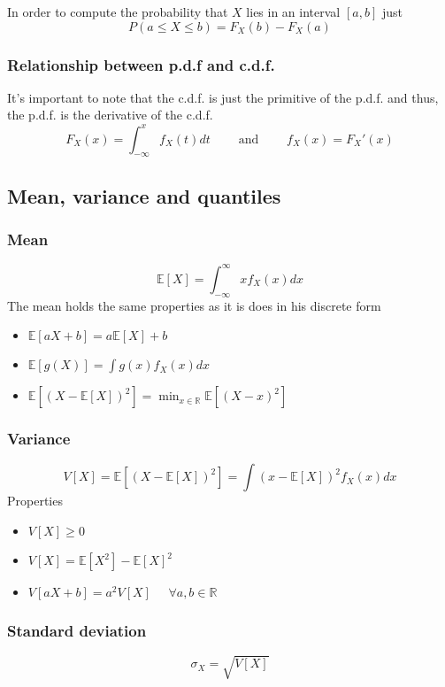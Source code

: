 \begin{tcolorbox}
    In order to compute the probability that $X$ lies in an interval $[a,b]$ just
    \[ P(a\leq X\leq b) = F_X(b)-F_X(a) \]
\end{tcolorbox}

\subsubsection{Relationship between p.d.f and c.d.f.}
It's important to note that the c.d.f. is just the primitive of the p.d.f. and thus, the
p.d.f. is the derivative of the c.d.f.
\[ F_X(x)=\int_{-\infty}^x f_X(t)dt\;\;\;\;\;\;\;\text{ and }\;\;\;\;\;\;\;
f_X(x) = F_X'(x)  \]

\subsection{Mean, variance and quantiles}
\subsubsection{Mean}
\[ \mathbb{E}[X]  = \int_{-\infty}^\infty xf_X(x)dx\]
The mean holds the same properties as it is does in his discrete form
\begin{itemize}
    \item $\mathbb{E}[aX+b] = a\mathbb{E}[X]+b$
    \item $\mathbb{E}[g(X)] = \int g(x)f_X(x)dx$
    \item $\mathbb{E}[(X-\mathbb{E}[X])^2] = \min_{x\in\mathbb{R}} \mathbb{E}[(X-x)^2]$
\end{itemize}

\subsubsection{Variance}
\[ V[X]=\mathbb{E}[(X-\mathbb{E}[X])^2] = \int (x-\mathbb{E}[X])^2 f_X(x)dx \]
Properties
\begin{itemize}
    \item $V[X]\geq 0$
    \item $V[X]=\mathbb{E}[X^2]-\mathbb{E}[X]^2$
    \item $V[aX+b] = a^2V[X]\;\;\;\;\; \forall a,b \in \mathbb{R}$
\end{itemize}

\subsubsection{Standard deviation}
\[ \sigma_X = \sqrt{V[X]} \]

